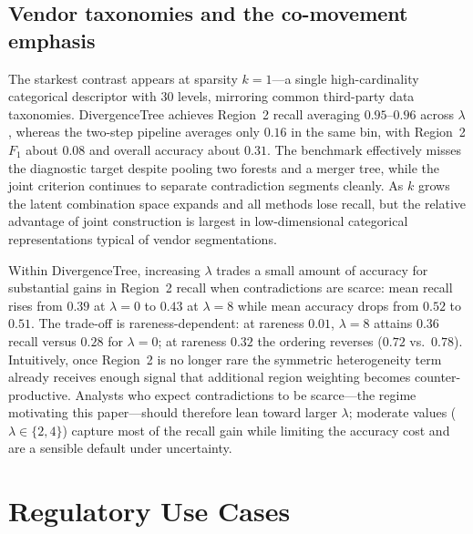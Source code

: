 \documentclass[12pt,a4paper]{article}
\begin{document}
\subsection{Vendor taxonomies and the co-movement emphasis}

The starkest contrast appears at sparsity $k{=}1$---a single high-cardinality categorical descriptor with 30 levels, mirroring common third-party data taxonomies. DivergenceTree achieves Region~2 recall averaging $0.95$--$0.96$ across $\lambda$, whereas the two-step pipeline averages only $0.16$ in the same bin, with Region~2 $F_1$ about $0.08$ and overall accuracy about $0.31$. The benchmark effectively misses the diagnostic target despite pooling two forests and a merger tree, while the joint criterion continues to separate contradiction segments cleanly. As $k$ grows the latent combination space expands and all methods lose recall, but the relative advantage of joint construction is largest in low-dimensional categorical representations typical of vendor segmentations.

Within DivergenceTree, increasing $\lambda$ trades a small amount of accuracy for substantial gains in Region~2 recall when contradictions are scarce: mean recall rises from $0.39$ at $\lambda{=}0$ to $0.43$ at $\lambda{=}8$ while mean accuracy drops from $0.52$ to $0.51$. The trade-off is rareness-dependent: at rareness $0.01$, $\lambda{=}8$ attains $0.36$ recall versus $0.28$ for $\lambda{=}0$; at rareness $0.32$ the ordering reverses ($0.72$ vs.\ $0.78$). Intuitively, once Region~2 is no longer rare the symmetric heterogeneity term already receives enough signal that additional region weighting becomes counter-productive. Analysts who expect contradictions to be scarce---the regime motivating this paper---should therefore lean toward larger $\lambda$; moderate values ($\lambda\in\{2,4\}$) capture most of the recall gain while limiting the accuracy cost and are a sensible default under uncertainty.

\section{Regulatory Use Cases}
\label{sec:applications}
\end{document}
